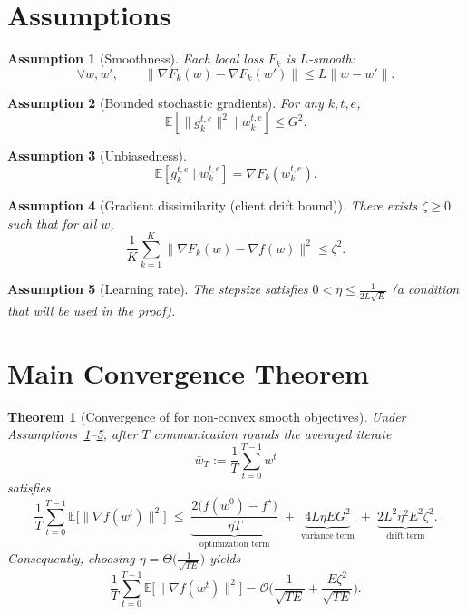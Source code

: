 \documentclass{article}
\newtheorem{theorem}{Theorem}
\newtheorem{assumption}{Assumption}
\newcommand{\E}{\mathbb{E}}
\newcommand{\fedavg}{\text{FedAvg}}
\begin{document}
\newpage
\section*{Assumptions}
\begin{assumption}[Smoothness]
\label{ass:smooth}
Each local loss $F_k$ is $L$‑smooth:
\[
\forall w, w',\qquad 
\|\nabla F_k(w)-\nabla F_k(w')\|\le L\|w-w'\|.
\]
\end{assumption}

\begin{assumption}[Bounded stochastic gradients]
\label{ass:bounded-grad}
For any $k,t,e$,
\[
\E\!\left[\|g_{k}^{t,e}\|^{2}\mid w_{k}^{t,e}\right]\le G^{2}.
\]
\end{assumption}

\begin{assumption}[Unbiasedness]
\label{ass:unbiased}
\[
\E\!\left[g_{k}^{t,e}\mid w_{k}^{t,e}\right]=\nabla F_k\!\left(w_{k}^{t,e}\right).
\]
\end{assumption}

\begin{assumption}[Gradient dissimilarity (client drift bound)]
\label{ass:drift}
There exists $\zeta\ge0$ such that for all $w$,
\[
\frac{1}{K}\sum_{k=1}^{K}\|\nabla F_k(w)-\nabla f(w)\|^{2}\le \zeta^{2}.
\]
\end{assumption}

\begin{assumption}[Learning rate]
\label{ass:lr}
The stepsize satisfies $0<\eta\le \frac{1}{2L\sqrt{E}}$ (a condition that will be used in the proof).
\end{assumption}

\section*{Main Convergence Theorem}
\begin{theorem}[Convergence of \fedavg for non‑convex smooth objectives]
\label{thm:main}
Under Assumptions~\ref{ass:smooth}–\ref{ass:lr}, after $T$ communication rounds the averaged iterate
\[
\bar w_T:=\frac{1}{T}\sum_{t=0}^{T-1} w^{t}
\]
satisfies
\[
\frac{1}{T}\sum_{t=0}^{T-1}\E\!\big[\|\nabla f(w^{t})\|^{2}\big]
\;\le\;
\underbrace{\frac{2\big(f(w^{0})-f^{\star}\big)}{\eta T}}_{\text{optimization term}}
\;+\;
\underbrace{4L\eta E G^{2}}_{\text{variance term}}
\;+\;
\underbrace{2L^{2}\eta^{2}E^{2}\zeta^{2}}_{\text{drift term}} .
\]
Consequently, choosing $\eta = \Theta\!\big(\frac{1}{\sqrt{TE}}\big)$ yields
\[
\frac{1}{T}\sum_{t=0}^{T-1}\E\!\big[\|\nabla f(w^{t})\|^{2}\big]=\mathcal{O}\!\Big(\frac{1}{\sqrt{TE}}+\frac{E\zeta^{2}}{\sqrt{TE}}\Big).
\]
\end{theorem}
\end{document}
